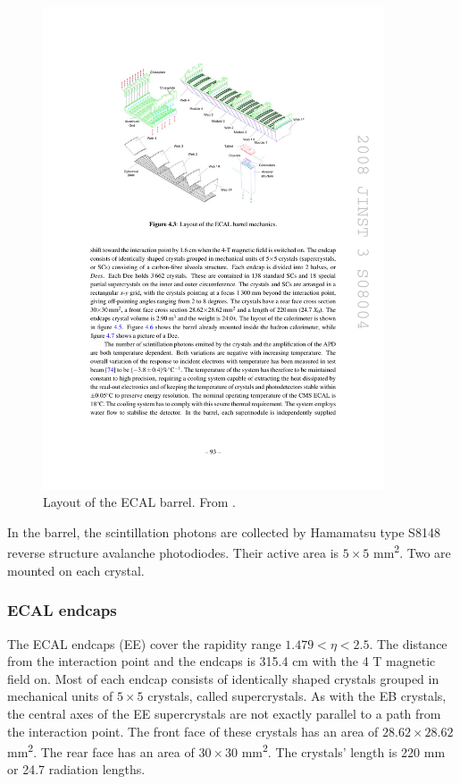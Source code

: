 \begin{figure}
\centering
\includegraphics[width=0.9\textwidth]{figures/ecal_barrel.pdf}
\caption{Layout of the ECAL barrel. From \cite{Chatrchyan:2008aa}.}
\label{fig:ecal_barrel}
\end{figure}

In the barrel, the scintillation photons are collected by Hamamatsu type S8148 reverse structure avalanche photodiodes.
Their active area is $5\times5$ mm\textsuperscript{2}. Two are mounted on each crystal.

\subsubsection{ECAL endcaps}
The ECAL endcaps (EE) cover the rapidity range $1.479 < \eta < 2.5$.
The distance from the interaction point and the endcaps is 315.4 cm with the 4 T magnetic field on.
Most of each endcap consists of identically shaped crystals grouped in mechanical units of $5\times5$ crystals, called supercrystals.
As with the EB crystals, the central axes of the EE supercrystals are not exactly parallel to a path from the interaction point. 
The front face of these crystals has an area of $28.62\times28.62$ mm\textsuperscript{2}.
The rear face has an area of $30\times30$ mm\textsuperscript{2}.
The crystals' length is 220 mm or 24.7 radiation lengths.

